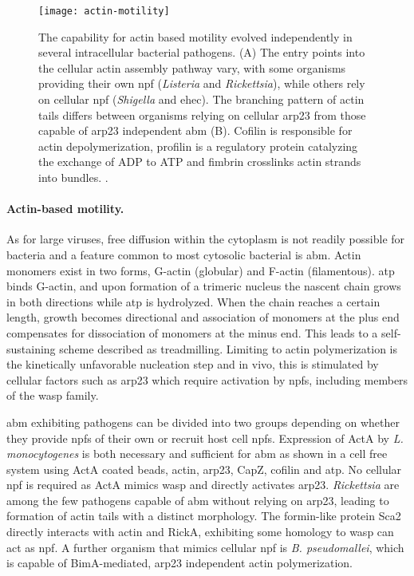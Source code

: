 \begin{figure}
  \centering
  \texttt{[image: actin-motility]}
  \caption[Mechanisms of actin based motility in several intracellular bacterial pathogens.]{The capability for actin based motility evolved independently in several intracellular bacterial pathogens. (A) The entry points into the cellular actin assembly pathway vary, with some organisms providing their own \acrlong{npf} (\textit{Listeria} and \textit{Rickettsia}), while others rely on cellular \gls{npf} (\textit{Shigella} and \acrlong{ehec}). The branching pattern of actin tails differs between organisms relying on cellular \gls{arp23} from those capable of \gls{arp23} independent \gls{abm} (B). Cofilin is responsible for actin depolymerization, profilin is a regulatory protein catalyzing the exchange of ADP to ATP and fimbrin crosslinks actin strands into bundles. \citep{Haglund2011}.}
  \label{fig:actin-motility}
\end{figure}

\label{actin-motility}
\paragraph{Actin-based motility.}
As for large viruses, free diffusion within the cytoplasm is not readily possible for bacteria and a feature common to most cytosolic bacterial is 
\gls{abm}. Actin monomers exist in two forms, G-actin (globular) and F-actin (filamentous). \Gls{atp} binds G-actin, and upon formation of a trimeric nucleus the nascent chain grows in both directions while \gls{atp} is hydrolyzed. When the chain reaches a certain length, growth becomes directional and association of monomers at the plus end compensates for dissociation of monomers at the minus end. This leads to a self-sustaining scheme described as treadmilling. Limiting to actin polymerization is the kinetically unfavorable nucleation step and in vivo, this is stimulated by cellular factors such as \gls{arp23} which require activation by \glspl{npf}, including members of the \gls{wasp} family.

\Gls{abm} exhibiting pathogens can be divided into two groups depending on whether they provide \glspl{npf} of their own or recruit host cell \glspl{npf}. Expression of ActA by \textit{L. monocytogenes} is both necessary and sufficient for \gls{abm} as shown in a cell free system using ActA coated beads, actin, \gls{arp23}, CapZ, cofilin and \gls{atp}. No cellular \gls{npf} is required as ActA mimics \gls{wasp} and directly activates \gls{arp23}. \textit{Rickettsia} are among the few pathogens capable of \gls{abm} without relying on \gls{arp23}, leading to formation of actin tails with a distinct morphology. The formin-like protein Sca2 directly interacts with actin and RickA, exhibiting some homology to \gls{wasp} can act as \gls{npf}. A further organism that mimics cellular \gls{npf} is \textit{B. pseudomallei}, which is capable of BimA-mediated, \gls{arp23} independent actin polymerization.

